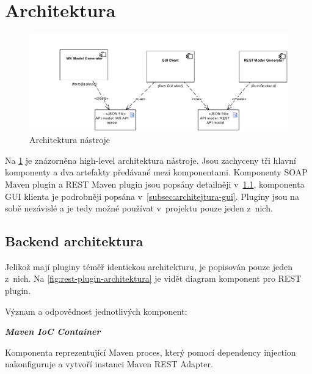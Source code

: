 \documentclass[11pt,twoside,a4paper]{book}
\begin{document}
\section{Architektura}

\begin{figure}[h]
\begin{center}
\includegraphics[width=14cm,left]{images-pdf/Architecture.pdf}
\caption{Architektura nástroje}
\label{fig:architektura}
\end{center}
\end{figure}

Na \ref{fig:architektura} je znázorněna high-level architektura nástroje. Jsou
zachyceny tři hlavní komponenty a dva artefakty předávané mezi komponentami.
Komponenty SOAP Maven plugin a REST Maven plugin jsou popsány detailněji
v~\ref{subsec:backend-architektura}, komponenta GUI klienta je podrobněji popsána
v~\ref{subsec:architejtura-gui}. Pluginy jsou na sobě nezávislé a je tedy možné
používat v~projektu pouze jeden z~nich.

\subsection{Backend architektura}
\label{subsec:backend-architektura}

Jelikož mají pluginy téměř identickou architekturu, je popisován pouze jeden
z~nich. Na \ref{fig:rest-plugin-architektura} je vidět diagram komponent pro REST
plugin.

Význam a odpovědnost jednotlivých komponent:

\textbf{\textit{Maven IoC Container}}

Komponenta reprezentující Maven proces, který pomocí dependency
injection \cite{IoCFowler} nakonfiguruje a vytvoří instanci Maven REST Adapter.
\end{document}
